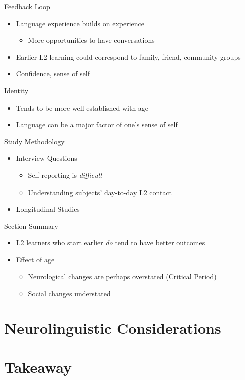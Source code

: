 \documentclass{beamer}
\begin{document}
\begin{frame}{Feedback Loop}
  \begin{itemize}
    \item Language experience builds on experience
    \begin{itemize}
      \item More opportunities to have conversations
    \end{itemize}
    \item Earlier L2 learning could correspond to family, friend, community groups
    \item Confidence, sense of self
  \end{itemize}
\end{frame}

\begin{frame}{Identity}
  \begin{itemize}
    \item Tends to be more well-established with age
    \item Language can be a major factor of one's sense of self
  \end{itemize}
\end{frame}

\begin{frame}{Study Methodology}
    \begin{itemize}
        \item Interview Questions
        \begin{itemize}
          \item Self-reporting is \emph{difficult}
          \item Understanding subjects' day-to-day L2 contact
        \end{itemize}
        \item Longitudinal Studies
    \end{itemize}
\end{frame}

\begin{frame}{Section Summary}
  \begin{itemize}
    \item L2 learners who start earlier \emph{do} tend to have better outcomes
    \item Effect of age
    \begin{itemize}
      \item Neurological changes are perhaps overstated (Critical Period)
      \item Social changes understated
    \end{itemize}
  \end{itemize}
\end{frame}

\section{Neurolinguistic Considerations}

\section{Takeaway}
\end{document}
